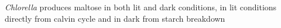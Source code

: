\textit{Chlorella} produces maltose in both lit and dark conditions, in lit conditions directly from calvin cycle and in dark
from starch breakdown \citep{Ziesenisz1981}


%
%
%
%
%
%
%
%
%
%
%
%



